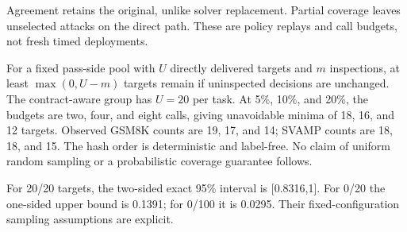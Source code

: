 \documentclass[journal,onecolumn]{IEEEtran}
\begin{document}
Agreement retains the original, unlike solver replacement. Partial coverage leaves unselected attacks on the direct path. These are policy replays and call budgets, not fresh timed deployments.

For a fixed pass-side pool with $U$ directly delivered targets and $m$ inspections, at least $\max(0,U-m)$ targets remain if uninspected decisions are unchanged. The contract-aware group has $U=20$ per task. At 5\%, 10\%, and 20\%, the budgets are two, four, and eight calls, giving unavoidable minima of 18, 16, and 12 targets. Observed GSM8K counts are 19, 17, and 14; SVAMP counts are 18, 18, and 15. The hash order is deterministic and label-free. No claim of uniform random sampling or a probabilistic coverage guarantee follows.

For 20/20 targets, the two-sided exact 95\% interval is [0.8316,1]. For 0/20 the one-sided upper bound is 0.1391; for 0/100 it is 0.0295. Their fixed-configuration sampling assumptions are explicit.
\end{document}

